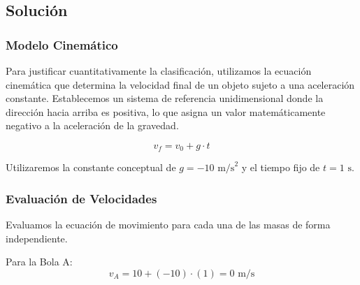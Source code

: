 \documentclass[12pt, a4paper]{article}
\begin{document}
\begin{center}
\end{center}

\subsection*{Solución}

\subsubsection*{Modelo Cinemático}

Para justificar cuantitativamente la clasificación, utilizamos la ecuación cinemática que determina la velocidad final de un objeto sujeto a una aceleración constante. Establecemos un sistema de referencia unidimensional donde la dirección hacia arriba es positiva, lo que asigna un valor matemáticamente negativo a la aceleración de la gravedad.

\begin{equation}
v_f = v_0 + g \cdot t
\end{equation}

Utilizaremos la constante conceptual de $g = -10 \text{ m/s}^2$ y el tiempo fijo de $t = 1 \text{ s}$.

\subsubsection*{Evaluación de Velocidades}

Evaluamos la ecuación de movimiento para cada una de las masas de forma independiente.

Para la Bola A:
\begin{equation}
v_A = 10 + (-10) \cdot (1) = 0 \text{ m/s}
\end{equation}
\end{document}
